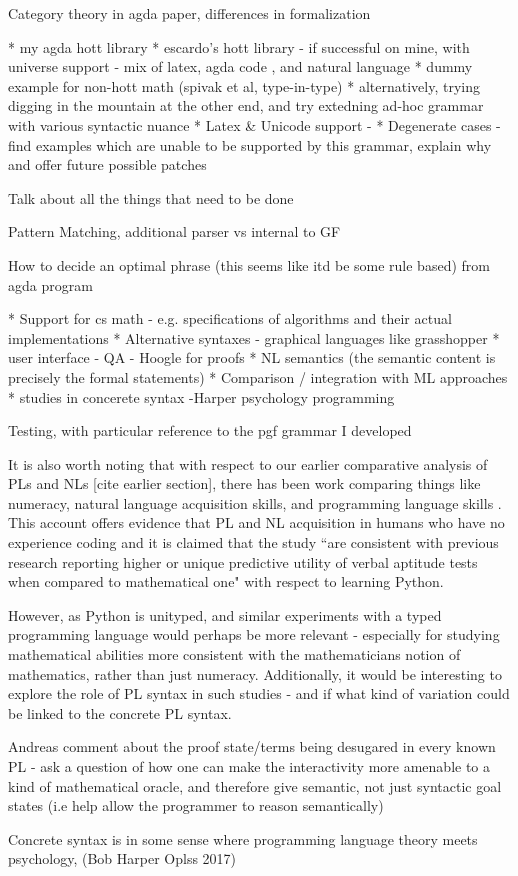 
Category theory in agda paper, differences in formalization

* my agda hott library
* escardo's hott library 
  - if successful on mine, with universe support
  - mix of latex, agda code , and natural language 
* dummy example for non-hott math (spivak et al, type-in-type)
* alternatively, trying digging in the mountain at the other end, and try extedning ad-hoc grammar with various syntactic nuance
* Latex & Unicode support  - 
* Degenerate cases
  - find examples which are unable to be supported by this grammar, explain why and offer future possible patches

Talk about all the things that need to be done

Pattern Matching, additional parser vs internal to GF

How to decide an optimal phrase (this seems like itd be some rule based) from agda program

* Support for cs math - e.g. specifications of algorithms and their actual implementations
* Alternative syntaxes - graphical languages like grasshopper
* user interface
  - QA
  - Hoogle for proofs
* NL semantics (the semantic content is precisely the formal statements)
* Comparison / integration with ML approaches
* studies in concerete syntax -Harper psychology {\intersect} programming

Testing, with particular reference to the pgf grammar I developed


It is also worth noting that with respect to our earlier comparative analysis
of PLs and NLs [cite earlier section], there has been work comparing things like
numeracy, natural language acquisition skills, and programming language skills
\cite{prat2020relating}.  This account offers evidence that PL and NL acquisition
in humans who have no experience coding 
and it is claimed that the study ``are consistent with previous research
reporting higher or unique predictive utility of verbal aptitude tests when
compared to mathematical one" with respect to learning Python.

However, as Python is unityped, and similar experiments with a typed programming
language would perhaps be more relevant - especially for studying mathematical
abilities more consistent with the mathematicians notion of mathematics, rather
than just numeracy. Additionally, it would be interesting to explore the role of
PL syntax in such studies - and if what kind of variation could be linked to the
concrete PL syntax.

Andreas comment about the proof state/terms being desugared in every known PL -
ask a question of how one can make the interactivity more amenable to a kind of
mathematical oracle, and therefore give semantic, not just syntactic goal states
(i.e help allow the programmer to reason semantically)

Concrete syntax is in some sense where programming language theory meets
psychology, (Bob Harper Oplss 2017)


